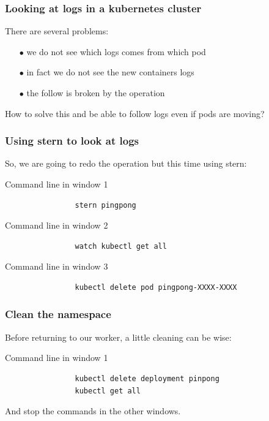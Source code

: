 	\begin{frame}[fragile]
		\frametitle{Looking at logs in a kubernetes cluster}
	
		There are several problems:
		\begin{itemize}
			\item[$\bullet$] we do not see which logs comes from which pod
			\item[$\bullet$] in fact we do not see the new containers logs
			\item[$\bullet$] the follow is broken by the operation
		\end{itemize}
		
		How to solve this and be able to follow logs even if pods are moving?
	\end{frame}

	\begin{frame}[fragile]
		\frametitle{Using stern to look at logs}

		So, we are going to redo the operation but this time using stern:
		\begin{block}{Command line in window 1}
			\begin{verbatim}
				stern pingpong
			\end{verbatim}
		\end{block}
				\begin{block}{Command line in window 2}
			\begin{verbatim}
				watch kubectl get all
			\end{verbatim}
		\end{block}
		\begin{block}{Command line in window 3}
			\begin{verbatim}
				kubectl delete pod pingpong-XXXX-XXXX
			\end{verbatim}
		\end{block}
	\end{frame}
	
	\begin{frame}[fragile]
		\frametitle{Clean the namespace}
		
		Before returning to our worker, a little cleaning can be wise:
		\begin{block}{Command line in window 1}
			\begin{verbatim}
				kubectl delete deployment pinpong
				kubectl get all
			\end{verbatim}
		\end{block}
		
		\medskip
		
		And stop the commands in the other windows.
	\end{frame}
	
